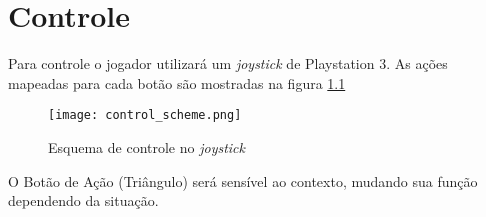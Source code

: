 \AddToShipoutPicture{\BackgroundPic}

\chapter{Controle}

Para controle o jogador utilizará um \emph{joystick} de Playstation 3. As ações mapeadas para cada botão são mostradas na figura \ref{control}
 
	\begin{figure}[h]
		\centering
		\texttt{[image: control\_scheme.png]}
		\caption{Esquema de controle no \emph{joystick}}
		\label{control}
	\end{figure}

O Botão de Ação (Triângulo) será sensível ao contexto, mudando sua função dependendo da situação.


